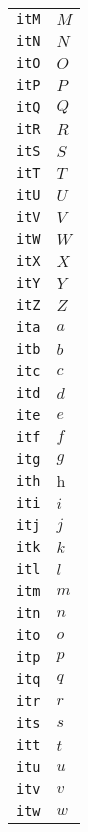\begin{longtable}{ll}
\texttt{itM}&${}\textit{M}{}$\\
\texttt{itN}&${}\textit{N}{}$\\
\texttt{itO}&${}\textit{O}{}$\\
\texttt{itP}&${}\textit{P}{}$\\
\texttt{itQ}&${}\textit{Q}{}$\\
\texttt{itR}&${}\textit{R}{}$\\
\texttt{itS}&${}\textit{S}{}$\\
\texttt{itT}&${}\textit{T}{}$\\
\texttt{itU}&${}\textit{U}{}$\\
\texttt{itV}&${}\textit{V}{}$\\
\texttt{itW}&${}\textit{W}{}$\\
\texttt{itX}&${}\textit{X}{}$\\
\texttt{itY}&${}\textit{Y}{}$\\
\texttt{itZ}&${}\textit{Z}{}$\\
\texttt{ita}&${}\textit{a}{}$\\
\texttt{itb}&${}\textit{b}{}$\\
\texttt{itc}&${}\textit{c}{}$\\
\texttt{itd}&${}\textit{d}{}$\\
\texttt{ite}&${}\textit{e}{}$\\
\texttt{itf}&${}\textit{f}{}$\\
\texttt{itg}&${}\textit{g}{}$\\
\texttt{ith}&${}\textit{h}{}$\\
\texttt{iti}&${}\textit{i}{}$\\
\texttt{itj}&${}\textit{j}{}$\\
\texttt{itk}&${}\textit{k}{}$\\
\texttt{itl}&${}\textit{l}{}$\\
\texttt{itm}&${}\textit{m}{}$\\
\texttt{itn}&${}\textit{n}{}$\\
\texttt{ito}&${}\textit{o}{}$\\
\texttt{itp}&${}\textit{p}{}$\\
\texttt{itq}&${}\textit{q}{}$\\
\texttt{itr}&${}\textit{r}{}$\\
\texttt{its}&${}\textit{s}{}$\\
\texttt{itt}&${}\textit{t}{}$\\
\texttt{itu}&${}\textit{u}{}$\\
\texttt{itv}&${}\textit{v}{}$\\
\texttt{itw}&${}\textit{w}{}$\\

\end{longtable}
